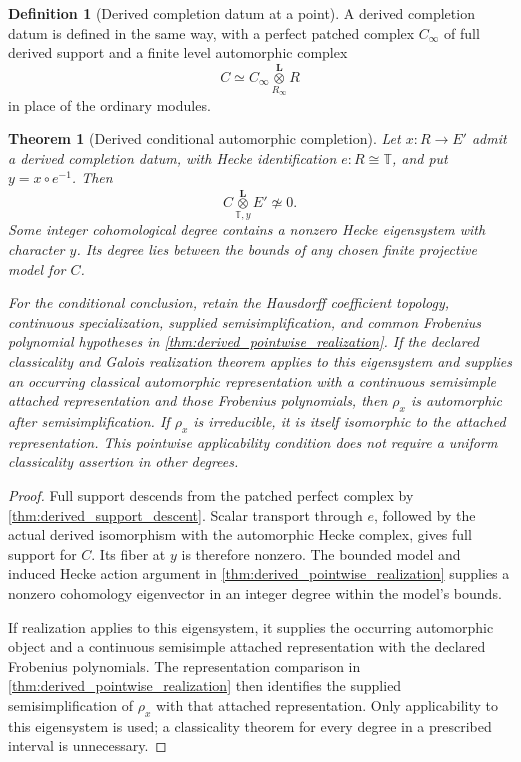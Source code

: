\documentclass[11pt]{amsart}
\newtheorem{theorem}{Theorem}[section]
\theoremstyle{definition}
\newtheorem{definition}[definition]{Definition}
\theoremstyle{remark}
\newcommand{\TT}{\mathbb T}
\begin{document}
\begin{definition}[Derived completion datum at a point]\label{def:derived_completion_datum}
A derived completion datum is defined in the same way, with a perfect patched complex
\(C_\infty\) of full derived support and a finite level automorphic complex
\[
C
\simeq
C_\infty
\mathbin{\mathop{\otimes}\limits_{R_\infty}^{\mathbf L}}R
\]
in place of the ordinary modules.
\end{definition}

\begin{theorem}[Derived conditional automorphic completion]\label{thm:derived_conditional_completion}
Let \(x:R\to E'\) admit a derived completion datum, with Hecke identification \(e:R\cong\TT\), and put \(y=x\circ e^{-1}\). Then
\[
\boxed{
C\mathbin{\mathop{\otimes}\limits_{\TT,y}^{\mathbf L}}E'\not\simeq0.
}
\]
Some integer cohomological degree contains a nonzero Hecke eigensystem with character \(y\). Its degree lies between the bounds of any chosen finite projective model for \(C\).

For the conditional conclusion, retain the Hausdorff coefficient topology, continuous specialization, supplied semisimplification, and common Frobenius polynomial hypotheses in \cref{thm:derived_pointwise_realization}. If the declared classicality and Galois realization theorem applies to this eigensystem and supplies an occurring classical automorphic representation with a continuous semisimple attached representation and those Frobenius polynomials, then \(\rho_x\) is automorphic after semisimplification. If \(\rho_x\) is irreducible, it is itself isomorphic to the attached representation. This pointwise applicability condition does not require a uniform classicality assertion in other degrees.
\end{theorem}

\begin{proof}
Full support descends from the patched perfect complex by \cref{thm:derived_support_descent}. Scalar transport through \(e\), followed by the actual derived isomorphism with the automorphic Hecke complex, gives full support for \(C\). Its fiber at \(y\) is therefore nonzero. The bounded model and induced Hecke action argument in \cref{thm:derived_pointwise_realization} supplies a nonzero cohomology eigenvector in an integer degree within the model's bounds.

If realization applies to this eigensystem, it supplies the occurring automorphic object and a continuous semisimple attached representation with the declared Frobenius polynomials. The representation comparison in \cref{thm:derived_pointwise_realization} then identifies the supplied semisimplification of \(\rho_x\) with that attached representation. Only applicability to this eigensystem is used; a classicality theorem for every degree in a prescribed interval is unnecessary.
\end{proof}
\end{document}
